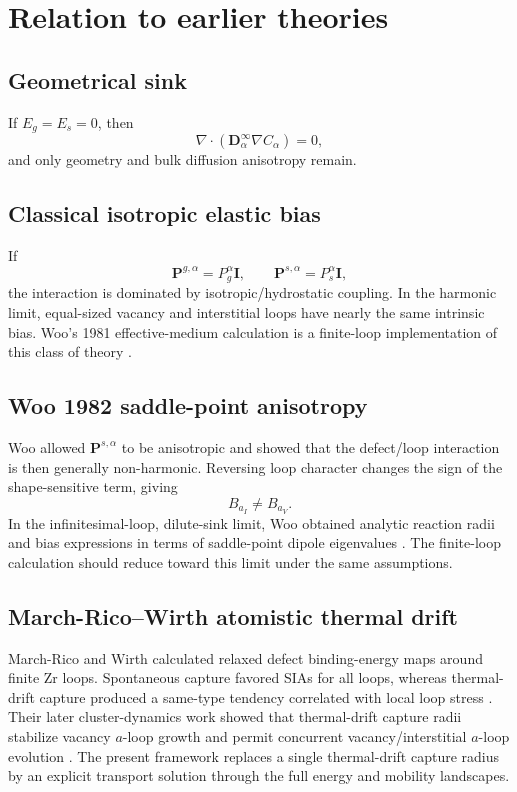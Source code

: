\documentclass[11pt]{article}
\newcommand{\bD}{\bm{D}}
\newcommand{\bP}{\bm{P}}
\begin{document}
\section{Relation to earlier theories}
\subsection{Geometrical sink}
If $E_g=E_s=0$, then
\begin{equation}
\nabla\cdot(\bD_\alpha^\infty\nabla C_\alpha)=0,
\end{equation}
and only geometry and bulk diffusion anisotropy remain.

\subsection{Classical isotropic elastic bias}
If
\begin{equation}
\bP^{g,\alpha}=P_g^\alpha\bm I,\qquad \bP^{s,\alpha}=P_s^\alpha\bm I,
\end{equation}
the interaction is dominated by isotropic/hydrostatic coupling. In the harmonic limit, equal-sized vacancy and interstitial loops have nearly the same intrinsic bias. Woo's 1981 effective-medium calculation is a finite-loop implementation of this class of theory \cite{Woo1981}.

\subsection{Woo 1982 saddle-point anisotropy}
Woo allowed $\bP^{s,\alpha}$ to be anisotropic and showed that the defect/loop interaction is then generally non-harmonic. Reversing loop character changes the sign of the shape-sensitive term, giving
\begin{equation}
B_{a_I}\ne B_{a_V}.
\end{equation}
In the infinitesimal-loop, dilute-sink limit, Woo obtained analytic reaction radii and bias expressions in terms of saddle-point dipole eigenvalues \cite{Woo1982}. The finite-loop calculation should reduce toward this limit under the same assumptions.

\subsection{March-Rico--Wirth atomistic thermal drift}
March-Rico and Wirth calculated relaxed defect binding-energy maps around finite Zr loops. Spontaneous capture favored SIAs for all loops, whereas thermal-drift capture produced a same-type tendency correlated with local loop stress \cite{MarchRicoWirth2023}. Their later cluster-dynamics work showed that thermal-drift capture radii stabilize vacancy $a$-loop growth and permit concurrent vacancy/interstitial $a$-loop evolution \cite{MarchRicoBlondelWirth2025}. The present framework replaces a single thermal-drift capture radius by an explicit transport solution through the full energy and mobility landscapes.
\end{document}
